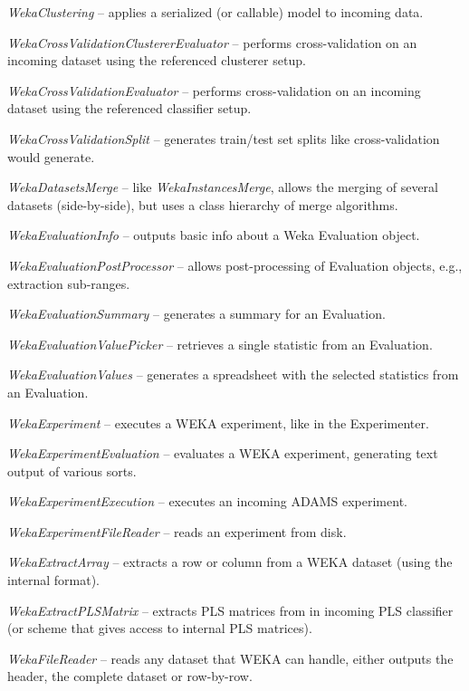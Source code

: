 \begin{tight_itemize}
	\item \textit{WekaClustering} -- applies a serialized (or callable) model
	to incoming data.
	\item \textit{WekaCrossValidationClustererEvaluator} -- performs cross-validation
	on an incoming dataset using the referenced clusterer setup.
	\item \textit{WekaCrossValidationEvaluator} -- performs cross-validation
	on an incoming dataset using the referenced classifier setup.
	\item \textit{WekaCrossValidationSplit} -- generates train/test set splits
	like cross-validation would generate.
	\item \textit{WekaDatasetsMerge} -- like \textit{WekaInstancesMerge},
	allows the merging of several datasets (side-by-side), but uses a class
	hierarchy of merge algorithms.
	\item \textit{WekaEvaluationInfo} -- outputs basic info about a Weka
	Evaluation object.
	\item \textit{WekaEvaluationPostProcessor} -- allows post-processing
	of Evaluation objects, e.g., extraction sub-ranges.
	\item \textit{WekaEvaluationSummary} -- generates a summary for an
	Evaluation.
	\item \textit{WekaEvaluationValuePicker} -- retrieves a single statistic
	from an Evaluation.
	\item \textit{WekaEvaluationValues} -- generates a spreadsheet with the
	selected statistics from an Evaluation.
	\item \textit{WekaExperiment} -- executes a WEKA experiment, like in the 
	Experimenter.
	\item \textit{WekaExperimentEvaluation} -- evaluates a WEKA experiment,
	generating text output of various sorts.
	\item \textit{WekaExperimentExecution} -- executes an incoming ADAMS
	experiment.
	\item \textit{WekaExperimentFileReader} -- reads an experiment from disk.
	\item \textit{WekaExtractArray} -- extracts a row or column from a WEKA
	dataset (using the internal format).
	\item \textit{WekaExtractPLSMatrix} -- extracts PLS matrices from in
	incoming PLS classifier (or scheme that gives access to internal PLS matrices).
	\item \textit{WekaFileReader} -- reads any dataset that WEKA can handle,
	either outputs the header, the complete dataset or row-by-row.

\end{tight_itemize}
